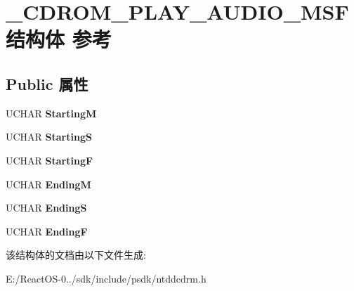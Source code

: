 \hypertarget{struct___c_d_r_o_m___p_l_a_y___a_u_d_i_o___m_s_f}{}\section{\+\_\+\+C\+D\+R\+O\+M\+\_\+\+P\+L\+A\+Y\+\_\+\+A\+U\+D\+I\+O\+\_\+\+M\+S\+F结构体 参考}
\label{struct___c_d_r_o_m___p_l_a_y___a_u_d_i_o___m_s_f}
\subsection*{Public 属性}
\begin{DoxyCompactItemize}
\item 
\mbox{\label{struct___c_d_r_o_m___p_l_a_y___a_u_d_i_o___m_s_f_a7703fb0e2e7e4192d483543e45a3a4dc}} 
U\+C\+H\+AR {\bfseries StartingM}
\item 
\mbox{\label{struct___c_d_r_o_m___p_l_a_y___a_u_d_i_o___m_s_f_a0357476f9fd776b1187f04be8889b7d7}} 
U\+C\+H\+AR {\bfseries StartingS}
\item 
\mbox{\label{struct___c_d_r_o_m___p_l_a_y___a_u_d_i_o___m_s_f_a915719c41272756901fed67bea1d21fc}} 
U\+C\+H\+AR {\bfseries StartingF}
\item 
\mbox{\label{struct___c_d_r_o_m___p_l_a_y___a_u_d_i_o___m_s_f_a73667a84f6a5bfef8051fd83bf5203e0}} 
U\+C\+H\+AR {\bfseries EndingM}
\item 
\mbox{\label{struct___c_d_r_o_m___p_l_a_y___a_u_d_i_o___m_s_f_a046194ef96c374c0ebc2100d1a9131e4}} 
U\+C\+H\+AR {\bfseries EndingS}
\item 
\mbox{\label{struct___c_d_r_o_m___p_l_a_y___a_u_d_i_o___m_s_f_a04ab47b6916a8fe7fe095c9f23c7d0bb}} 
U\+C\+H\+AR {\bfseries EndingF}
\end{DoxyCompactItemize}


该结构体的文档由以下文件生成\+:\begin{DoxyCompactItemize}
\item 
E\+:/\+React\+O\+S-\/0../sdk/include/psdk/ntddcdrm.\+h\end{DoxyCompactItemize}

